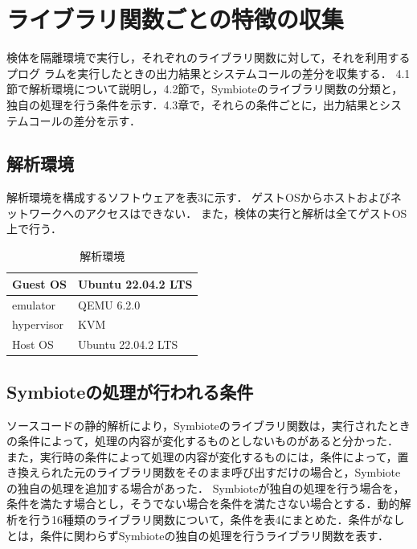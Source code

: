 \documentclass[submit,techreq,noauthor]{eco}	%
\begin{document}
\section{ライブラリ関数ごとの特徴の収集}
検体を隔離環境で実行し，それぞれのライブラリ関数に対して，それを利用するプログ
ラムを実行したときの出力結果とシステムコールの差分を収集する．
4.1節で解析環境について説明し，4.2節で，Symbioteのライブラリ関数の分類と，独自の処理を行う条件を示す．4.3章で，それらの条件ごとに，出力結果とシステムコールの差分を示す．

\subsection{解析環境}
解析環境を構成するソフトウェアを表3に示す．
ゲストOSからホストおよびネットワークへのアクセスはできない．
また，検体の実行と解析は全てゲストOS上で行う．

\begin{table}[t]
  \caption{解析環境}
  \label{table: 解析環境}
  \centering
  \begin{tabular}{|l|l|}
  \hline
  Guest OS   & Ubuntu 22.04.2 LTS \\ \hline
  emulator   & QEMU 6.2.0         \\ \hline
  hypervisor & KVM                \\ \hline
  Host OS    & Ubuntu 22.04.2 LTS \\ \hline
  \end{tabular}
\end{table}

\subsection{Symbioteの処理が行われる条件}
ソースコードの静的解析により，Symbioteのライブラリ関数は，実行されたときの条件によって，処理の内容が変化するものとしないものがあると分かった．
また，実行時の条件によって処理の内容が変化するものには，条件によって，置き換えられた元のライブラリ関数をそのまま呼び出すだけの場合と，Symbioteの独自の処理を追加する場合があった．
Symbioteが独自の処理を行う場合を，条件を満たす場合とし，そうでない場合を条件を満たさない場合とする．動的解析を行う16種類のライブラリ関数について，条件を表4にまとめた．条件がなしとは，条件に関わらずSymbioteの独自の処理を行うライブラリ関数を表す．
\indent
\end{document}
